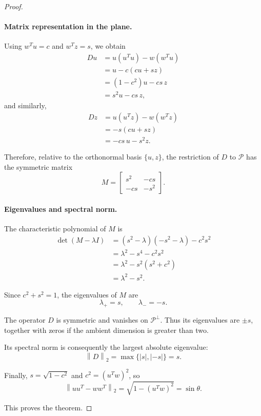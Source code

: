 \documentclass[14pt,letterpaper]{article}
\theoremstyle{plain}
\theoremstyle{definition}
\theoremstyle{remark}
\newcommand{\norm}[1]{\left\lVert #1 \right\rVert}
\newcommand{\abs}[1]{\left| #1 \right|}
\begin{document}
\begin{proof}
\paragraph{Matrix representation in the plane.}

Using $w^Tu=c$ and $w^Tz=s$, we obtain
\[
\begin{aligned}
Du
&=u(u^Tu)-w(w^Tu)\\
&=u-c(cu+sz)\\
&=(1-c^2)u-cs\,z\\
&=s^2u-cs\,z,
\end{aligned}
\]
and similarly,
\[
\begin{aligned}
Dz
&=u(u^Tz)-w(w^Tz)\\
&=-s(cu+sz)\\
&=-cs\,u-s^2z.
\end{aligned}
\]

Therefore, relative to the orthonormal basis
$\{u,z\}$, the restriction of $D$ to $\mathcal P$
has the symmetric matrix
\[
\boxed{
M=\begin{bmatrix}
s^2 & -cs\\
-cs & -s^2
\end{bmatrix}.
}
\]

\paragraph{Eigenvalues and spectral norm.}

The characteristic polynomial of $M$ is
\[
\begin{aligned}
\det(M-\lambda I)
&=(s^2-\lambda)(-s^2-\lambda)-c^2s^2\\
&=\lambda^2-s^4-c^2s^2\\
&=\lambda^2-s^2(s^2+c^2)\\
&=\lambda^2-s^2.
\end{aligned}
\]

Since $c^2+s^2=1$, the eigenvalues of $M$ are
\[
\lambda_+=s,
\qquad
\lambda_-=-s.
\]

The operator $D$ is symmetric and vanishes on
$\mathcal P^\perp$. Thus its eigenvalues are
$\pm s$, together with zeros if the ambient
dimension is greater than two.

Its spectral norm is consequently the largest
absolute eigenvalue:
\[
\boxed{
\norm{D}_2=\max\{\abs{s},\abs{-s}\}=s.
}
\]

Finally, $s=\sqrt{1-c^2}$ and
$c^2=(u^Tw)^2$, so
\[
\boxed{
\norm{uu^T-ww^T}_2
=\sqrt{1-(u^Tw)^2}
=\sin\theta.
}
\]

This proves the theorem.

\end{proof}
\end{document}
